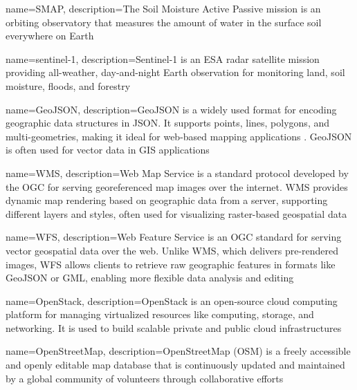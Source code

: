 {
    name=SMAP,
    description={The Soil Moisture Active Passive mission is an orbiting observatory that measures the amount of water in the surface soil everywhere on Earth \cite{nasaSMAP}}
}

{
    name=sentinel-1,
    description={Sentinel-1 is an ESA radar satellite mission providing all-weather, day-and-night Earth observation for monitoring land, soil moisture, floods, and forestry \cite{esa_sentinel-1}}
}

{
    name=GeoJSON,
    description={GeoJSON is a widely used format for encoding geographic data structures in JSON. It supports points, lines, polygons, and multi-geometries, making it ideal for web-based mapping applications \cite{geojson}. GeoJSON is often used for vector data in GIS applications}
}

{
    name=WMS,
    description={Web Map Service is a standard protocol developed by the OGC for serving georeferenced map images over the internet. WMS provides dynamic map rendering based on geographic data from a server, supporting different layers and styles, often used for visualizing raster-based geospatial data \cite{ogc2006wms}}
}

{
    name=WFS,
    description={Web Feature Service is an OGC standard for serving vector geospatial data over the web. Unlike WMS, which delivers pre-rendered images, WFS allows clients to retrieve raw geographic features in formats like GeoJSON or GML, enabling more flexible data analysis and editing \cite{ogc2005wfs}}
}

{
    name=OpenStack,
    description={OpenStack is an open-source cloud computing platform for managing virtualized resources like computing, storage, and networking. It is used to build scalable private and public cloud infrastructures \cite{openstack}}
}

{
    name=OpenStreetMap,
    description={OpenStreetMap (OSM) is a freely accessible and openly editable map database that is continuously updated and maintained by a global community of volunteers through collaborative efforts \cite{openstreetmap}}
}



